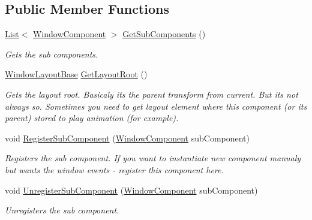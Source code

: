 \subsection*{Public Member Functions}
\begin{DoxyCompactItemize}
\item 
\hyperlink{class_unity_engine_1_1_u_i_1_1_windows_1_1_components_1_1_list}{List}$<$ \hyperlink{class_unity_engine_1_1_u_i_1_1_windows_1_1_window_component}{Window\+Component} $>$ \hyperlink{class_unity_engine_1_1_u_i_1_1_windows_1_1_window_component_a750e8651ae76d508f14519ebc2c22b8f}{Get\+Sub\+Components} ()
\begin{DoxyCompactList}\small\item\em Gets the sub components. \end{DoxyCompactList}\item 
\hyperlink{class_unity_engine_1_1_u_i_1_1_windows_1_1_window_layout_base}{Window\+Layout\+Base} \hyperlink{class_unity_engine_1_1_u_i_1_1_windows_1_1_window_component_adb60a76d7445f8dcd124308a7f8ef089}{Get\+Layout\+Root} ()
\begin{DoxyCompactList}\small\item\em Gets the layout root. Basicaly it\textquotesingle{}s the parent transform from current. But it\textquotesingle{}s not always so. Sometimes you need to get layout element where this component (or it\textquotesingle{}s parent) stored to play animation (for example). \end{DoxyCompactList}\item 
void \hyperlink{class_unity_engine_1_1_u_i_1_1_windows_1_1_window_component_ad6b58c3dad696c51edc18b02c9f92054}{Register\+Sub\+Component} (\hyperlink{class_unity_engine_1_1_u_i_1_1_windows_1_1_window_component}{Window\+Component} sub\+Component)
\begin{DoxyCompactList}\small\item\em Registers the sub component. If you want to instantiate new component manualy but wants the window events -\/ register this component here. \end{DoxyCompactList}\item 
void \hyperlink{class_unity_engine_1_1_u_i_1_1_windows_1_1_window_component_ab7ddc6b16f344d08d45ba1011c9dc92a}{Unregister\+Sub\+Component} (\hyperlink{class_unity_engine_1_1_u_i_1_1_windows_1_1_window_component}{Window\+Component} sub\+Component)
\begin{DoxyCompactList}\small\item\em Unregisters the sub component. \end{DoxyCompactList}\item 

\end{DoxyCompactItemize}
